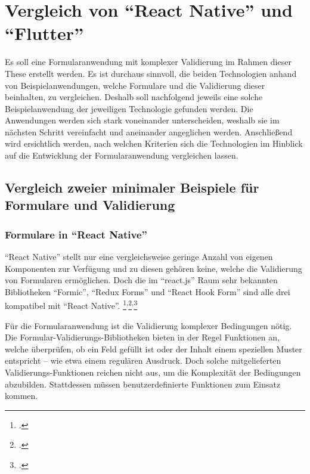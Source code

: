 \clearpage
\section{Vergleich von \enquote{React Native} und \enquote{Flutter}}
\label{sec:Vergleich-React-Native-und-Flutter}


Es soll eine Formularanwendung mit komplexer Validierung im Rahmen dieser These erstellt werden.
Es ist durchaus sinnvoll, die beiden Technologien anhand von  Beispielanwendungen, welche Formulare und die Validierung dieser  beinhalten,   zu vergleichen.
Deshalb soll nachfolgend  jeweils eine solche Beispielanwendung der jeweiligen Technologie gefunden werden.
Die Anwendungen werden sich stark voneinander unterscheiden, weshalb sie im nächsten Schritt vereinfacht und aneinander angeglichen werden.
Anschließend wird ersichtlich werden, nach welchen Kriterien sich die Technologien im Hinblick auf die Entwicklung der Formularanwendung vergleichen lassen.

\subsection{Vergleich zweier minimaler Beispiele für Formulare und Validierung}

\subsubsection{Formulare in \enquote{React Native}}

\enquote{React Native} stellt nur eine vergleichsweise geringe Anzahl von eigenen Komponenten zur Verfügung und zu diesen gehören keine, welche die Validierung von Formularen ermöglichen.
Doch die im \enquote{react.js} Raum sehr bekannten Bibliotheken \enquote{Formic}, \enquote{Redux Forms} und \enquote{React Hook Form} sind alle drei kompatibel mit \enquote{React Native}.
\footcite[Vgl.][]{ReactNativeFormikDocs}\textsuperscript{,}\footcite[Vgl.][]{DoesReduxFormWorkWithReactNative}\textsuperscript{,}\footcite[Vgl.][]{ReactNativeReactHookFormGetStarted}


Für die Formularanwendung ist die Validierung komplexer Bedingungen nötig.
Die Formular-Validierungs-Bibliotheken bieten in der Regel Funktionen an, welche überprüfen, ob ein Feld gefüllt ist oder der Inhalt einem speziellen Muster entspricht -- wie etwa einem regulären Ausdruck.
Doch solche mitgelieferten Validierungs-Funktionen reichen nicht aus, um die Komplexität der Bedingungen abzubilden.
Stattdessen müssen benutzerdefinierte Funktionen zum Einsatz kommen.

